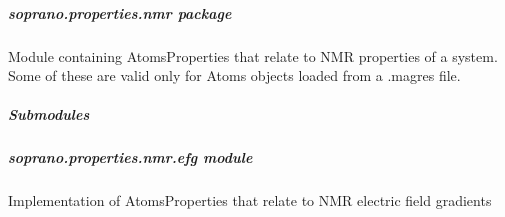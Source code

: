 \documentclass[letterpaper,10pt,english]{sphinxmanual}
\begin{document}
\subparagraph{soprano.properties.nmr package}
\label{doctree/soprano.properties.nmr:module-soprano.properties.nmr}\label{doctree/soprano.properties.nmr::doc}\label{doctree/soprano.properties.nmr:soprano-properties-nmr-package}
Module containing AtomsProperties that relate to NMR properties of a system.
Some of these are valid only for Atoms objects loaded from a .magres file.


\subparagraph{Submodules}
\label{doctree/soprano.properties.nmr:submodules}

\subparagraph{soprano.properties.nmr.efg module}
\label{doctree/soprano.properties.nmr.efg::doc}\label{doctree/soprano.properties.nmr.efg:module-soprano.properties.nmr.efg}\label{doctree/soprano.properties.nmr.efg:soprano-properties-nmr-efg-module}
Implementation of AtomsProperties that relate to NMR electric field
gradients
\end{document}
